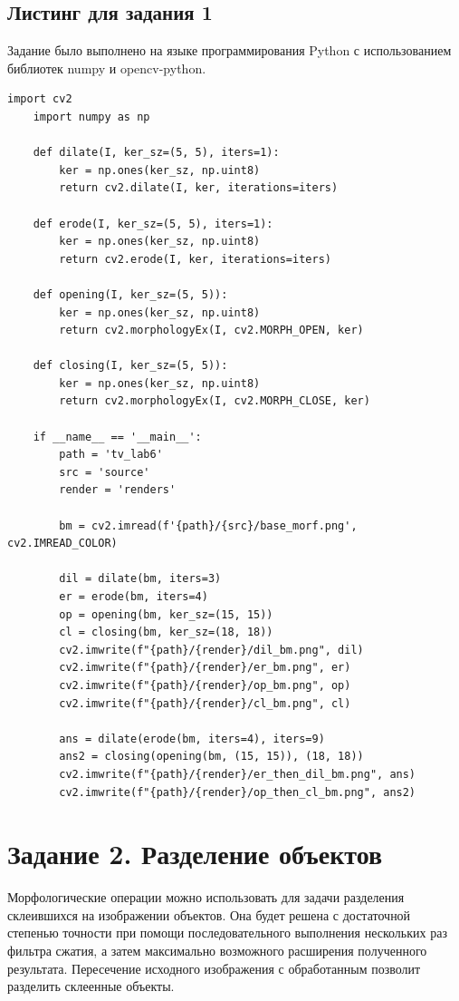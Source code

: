\documentclass[a4paper, 12pt]{article}
\begin{document}
    \subsection{Листинг для задания 1}
    Задание было выполнено на языке программирования Python с использованием библиотек numpy и opencv-python.
    \begin{lstlisting}[label=task1, caption=Программа для базовых морфологических операций]
    import cv2
    import numpy as np

    def dilate(I, ker_sz=(5, 5), iters=1):
        ker = np.ones(ker_sz, np.uint8)
        return cv2.dilate(I, ker, iterations=iters)
    
    def erode(I, ker_sz=(5, 5), iters=1):
        ker = np.ones(ker_sz, np.uint8)
        return cv2.erode(I, ker, iterations=iters)
    
    def opening(I, ker_sz=(5, 5)):
        ker = np.ones(ker_sz, np.uint8)
        return cv2.morphologyEx(I, cv2.MORPH_OPEN, ker)
    
    def closing(I, ker_sz=(5, 5)):
        ker = np.ones(ker_sz, np.uint8)
        return cv2.morphologyEx(I, cv2.MORPH_CLOSE, ker)

    if __name__ == '__main__':
        path = 'tv_lab6'
        src = 'source'
        render = 'renders'
        
        bm = cv2.imread(f'{path}/{src}/base_morf.png', cv2.IMREAD_COLOR)
    
        dil = dilate(bm, iters=3)
        er = erode(bm, iters=4)
        op = opening(bm, ker_sz=(15, 15))
        cl = closing(bm, ker_sz=(18, 18))
        cv2.imwrite(f"{path}/{render}/dil_bm.png", dil)
        cv2.imwrite(f"{path}/{render}/er_bm.png", er)
        cv2.imwrite(f"{path}/{render}/op_bm.png", op)
        cv2.imwrite(f"{path}/{render}/cl_bm.png", cl)
    
        ans = dilate(erode(bm, iters=4), iters=9)
        ans2 = closing(opening(bm, (15, 15)), (18, 18))
        cv2.imwrite(f"{path}/{render}/er_then_dil_bm.png", ans)
        cv2.imwrite(f"{path}/{render}/op_then_cl_bm.png", ans2)
    \end{lstlisting}


    \section{Задание 2. Разделение объектов}
    Морфологические операции можно использовать для задачи разделения склеившихся на изображении объектов.
    Она будет решена с достаточной степенью точности при помощи последовательного выполнения нескольких
    раз фильтра сжатия, а затем максимально возможного расширения полученного результата. Пересечение
    исходного изображения с обработанным позволит разделить склеенные объекты.
\end{document}
